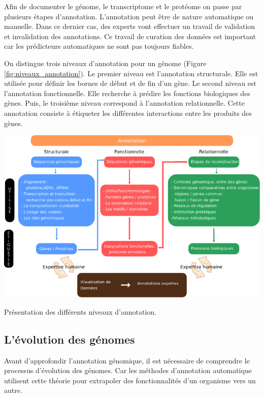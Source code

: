 \begin{refsegment}
    Afin de documenter le génome, le transcriptome et le protéome on passe par plusieurs étapes d’annotation. L’annotation peut être de nature automatique ou manuelle. Dans ce dernier cas, des experts vont effectuer un travail de validation et invalidation des annotations. Ce travail de curation des données est important car les prédicteurs automatiques ne sont pas toujours fiables.
    
    On distingue trois niveaux d’annotation pour un génome (Figure \ref{fig:niveaux_annotation}). Le premier niveau est l’annotation structurale. Elle est utilisée pour définir les bornes de début et de fin d’un gène.  Le second niveau est l’annotation fonctionnelle. Elle recherche à prédire les fonctions biologiques des gènes. Puis, le troisième niveau correspond à l’annotation relationnelle. Cette annotation consiste à étiqueter les différentes interactions entre les produits des gènes.
    
    \begin{shadedfigure}
        \centering
        \includegraphics[width=\textwidth]{img/niveaux_annotations.pdf}
        \caption{Présentation des différents niveaux d’annotation.}
        \label{fig:niveaux_annotation}
    \end{shadedfigure}
    
    \subsection{L’évolution des génomes}
    Avant d'approfondir l’annotation génomique, il est nécessaire de comprendre le processus d’évolution des génomes. Car les méthodes d’annotation automatique utilisent cette théorie pour extrapoler des fonctionnalités d’un organisme vers un autre.
    

\end{refsegment}
